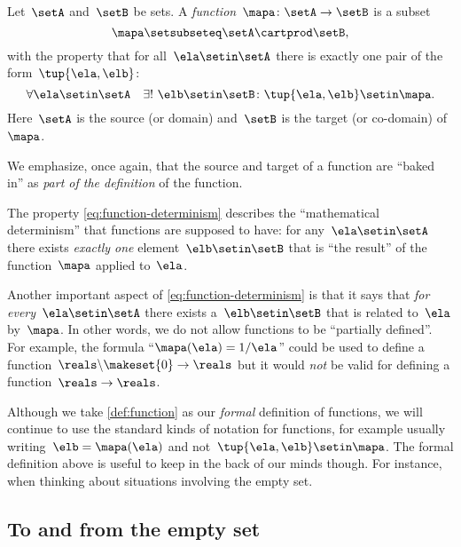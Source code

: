 \begin{ctdefinition}[Function]
    \label{def:function}
    Let~$\setA$ and~$\setB$ be sets.
    A \emph{function}~$\mapa\colon \setA \to \setB$ is a subset
    \begin{equation*}
        \mapa \setsubseteq \setA \cartprod \setB,
    \end{equation*}
    with the property that for all~$\ela \setin\setA$ there is exactly one pair of the form~$\tup{\ela,\elb}$:
    \begin{equation}
        \label{eq:function-determinism}
        \forall \ela \setin\setA  \quad  \exists !
        \ \elb \setin\setB \colon \tup{\ela,\elb} \setin\mapa.
    \end{equation}
    Here~$\setA$ is the source (or domain) and~$\setB$ is the target (or co-domain) of~$\mapa$.
\end{ctdefinition}

We emphasize, once again, that the source and target of a function are ``baked in'' as \emph{part of the definition} of the function.

The property \cref{eq:function-determinism} describes the ``mathematical determinism'' that functions are supposed to have: for any~$\ela \setin\setA$ there exists \emph{exactly one} element~$\elb \setin\setB$ that is ``the result'' of the function~$\mapa$ applied to~$\ela$.

Another important aspect of \cref{eq:function-determinism} is that it says that \emph{for every}~$\ela \setin\setA$ there exists a~$\elb \setin\setB$ that is related to~$\ela$ by~$\mapa$.
In other words, we do not allow functions to be ``partially defined''.
For example, the formula ``$\mapa(\ela) = 1/ \ela$'' could be used to define a function~$\reals \backslash \makeset{ 0 } \to \reals$ but it would \emph{not} be valid for defining a function~$\reals \to \reals$.

Although we take \cref{def:function} as our \emph{formal} definition of functions, we will continue to use the standard kinds of notation for functions, for example usually writing~$\elb = \mapa(\ela)$ and not~$\tup{\ela, \elb} \setin\mapa$.
The formal definition above is useful to keep in the back of our minds though.
For instance, when thinking about situations involving the empty set.

\subsection{To and from the empty set}

